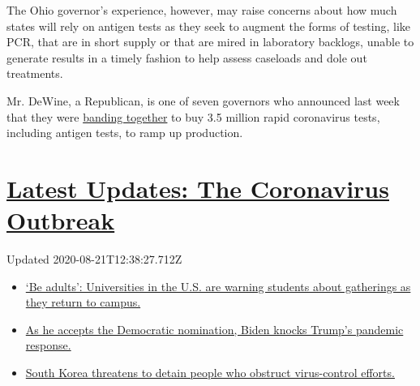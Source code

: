 The Ohio governor's experience, however, may raise concerns about how
much states will rely on antigen tests as they seek to augment the forms
of testing, like PCR, that are in short supply or that are mired in
laboratory backlogs, unable to generate results in a timely fashion to
help assess caseloads and dole out treatments.

Mr. DeWine, a Republican, is one of seven governors who announced last
week that they were
\href{https://governor.maryland.gov/2020/08/04/governors-of-maryland-louisiana-massachusetts-michigan-ohio-and-virginia-announce-major-bipartisan-interstate-compact-for-three-million-rapid-antigen-tests/}{banding
together} to buy 3.5 million rapid coronavirus tests, including antigen
tests, to ramp up production.

\hypertarget{latest-updates-the-coronavirus-outbreak}{%
\section{\texorpdfstring{\href{https://www.nytimes3xbfgragh.onion/2020/08/21/world/covid-19-coronavirus.html?action=click\&pgtype=Article\&state=default\&region=MAIN_CONTENT_1\&context=storylines_live_updates}{Latest
Updates: The Coronavirus
Outbreak}}{Latest Updates: The Coronavirus Outbreak}}\label{latest-updates-the-coronavirus-outbreak}}

Updated 2020-08-21T12:38:27.712Z

\begin{itemize}
\tightlist
\item
  \href{https://www.nytimes3xbfgragh.onion/2020/08/21/world/covid-19-coronavirus.html?action=click\&pgtype=Article\&state=default\&region=MAIN_CONTENT_1\&context=storylines_live_updates\#link-6a60a19d}{`Be
  adults': Universities in the U.S. are warning students about
  gatherings as they return to campus.}
\item
  \href{https://www.nytimes3xbfgragh.onion/2020/08/21/world/covid-19-coronavirus.html?action=click\&pgtype=Article\&state=default\&region=MAIN_CONTENT_1\&context=storylines_live_updates\#link-324af071}{As
  he accepts the Democratic nomination, Biden knocks Trump's pandemic
  response.}
\item
  \href{https://www.nytimes3xbfgragh.onion/2020/08/21/world/covid-19-coronavirus.html?action=click\&pgtype=Article\&state=default\&region=MAIN_CONTENT_1\&context=storylines_live_updates\#link-191d44be}{South
  Korea threatens to detain people who obstruct virus-control efforts.}
\end{itemize}

